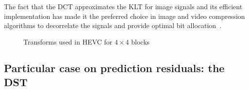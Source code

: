 \documentclass[11pt,a4paper,openright,twoside]{book}
\numberwithin{equation}{section} %
\numberwithin{figure}{section} %
\numberwithin{table}{section} %
\begin{document}
The fact that the \ac{DCT} approximates the \ac{KLT} for image signals and its
efficient implementation has made it the preferred choice in image and video
compression algorithms to decorrelate the signals and provide optimal bit
allocation~\cite{sole-12-transform-coefficient-coding}.

\begin{figure}[tb]
	\centering
	\hspace{0.2\linewidth}
	\caption{Transforms used in \ac{HEVC} for $4\times4$ blocks}
	\label{fig:dct_dst}
\end{figure}

\subsection{Particular case on prediction residuals: the \acs{DST}}
\label{sub:particular_case_dst}
\end{document}
